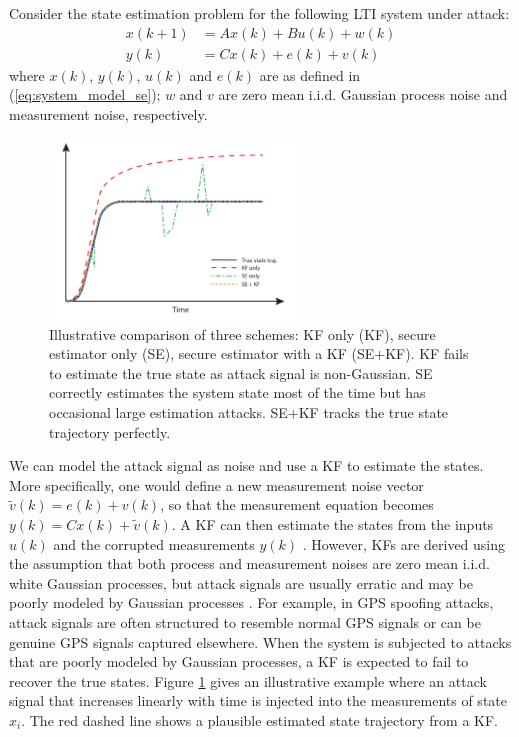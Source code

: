 \documentclass[../../thesis.tex]{subfiles}
\begin{document}
Consider the state estimation problem for the following LTI system under attack:
\begin{equation}
\begin{aligned}
x(k+1) & = A x(k) + B u(k) + w(k)\\
y(k) & = C x(k) + e(k) + v(k)
\end{aligned}
\label{eq:noise_model}
\end{equation}
where $x(k)$, $y(k)$, $u(k)$ and $e(k)$ are as defined in (\ref{eq:system_model_se});
$w$ and $v$ are zero mean i.i.d. Gaussian process noise and measurement noise, respectively. 
\begin{figure}
\center
\includegraphics[width=0.6\textwidth]{chapters/se_linear/figures/qh/est_illu.pdf}
\caption{Illustrative comparison of three schemes: KF only (KF), secure estimator only (SE), secure estimator with a KF (SE+KF). KF fails to estimate the true state as attack signal is non-Gaussian. SE correctly estimates the system state most of the time but has occasional large estimation attacks. SE+KF tracks the true state trajectory perfectly.}
\label{fig:estimation}
\end{figure}
We can model the attack signal as noise and use a KF to estimate the states. More specifically, one would define a new measurement noise vector $\tilde{v}(k) = e(k) + v(k)$, so that the measurement equation becomes $y(k) = C x(k) + \tilde{v}(k)$. A KF can then estimate the states from the inputs $u(k)$ and the corrupted measurements $y(k)$ \cite{KwonACC}. However, KFs are derived using the assumption that both process and measurement noises are zero mean i.i.d. white Gaussian processes, but attack signals are usually erratic and may be poorly modeled by Gaussian processes \cite{KwonACC}. For example, in GPS spoofing attacks, attack signals are often structured to resemble normal GPS signals or can be genuine GPS signals captured elsewhere. %
When the system is subjected to attacks that are poorly modeled by Gaussian processes, a KF is expected to fail to recover the true states. Figure \ref{fig:estimation} gives an illustrative example where an attack signal that increases linearly with time is injected into the measurements of state $x_i$. The red dashed line shows a plausible estimated state trajectory from a KF.
\end{document}
